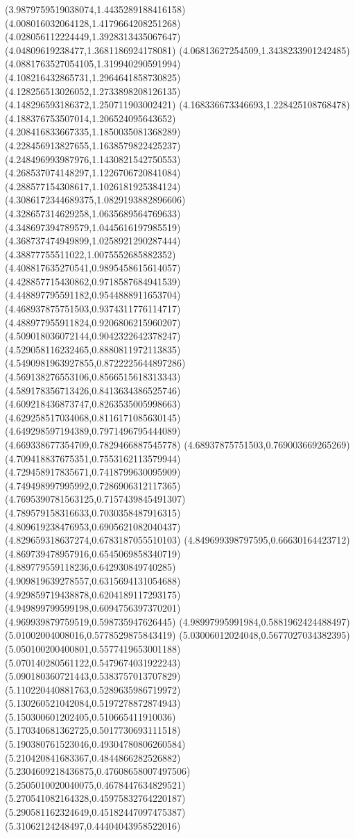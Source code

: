 {(3.9879759519038074,1.4435289188416158)
(4.008016032064128,1.4179664208251268)
(4.028056112224449,1.3928313435067647)
(4.04809619238477,1.3681186924178081)
(4.06813627254509,1.3438233901242485)
(4.0881763527054105,1.319940290591994)
(4.108216432865731,1.2964641858730825)
(4.128256513026052,1.2733898208126135)
(4.148296593186372,1.250711903002421)
(4.168336673346693,1.228425108768478)
(4.188376753507014,1.206524095643652)
(4.208416833667335,1.1850035081368289)
(4.228456913827655,1.1638579822425237)
(4.248496993987976,1.1430821542750553)
(4.268537074148297,1.1226706720841084)
(4.288577154308617,1.1026181925384124)
(4.3086172344689375,1.0829193882896606)
(4.328657314629258,1.0635689564769633)
(4.348697394789579,1.0445616197985519)
(4.368737474949899,1.0258921290287444)
(4.38877755511022,1.0075552685882352)
(4.408817635270541,0.9895458615614057)
(4.428857715430862,0.9718587684941539)
(4.448897795591182,0.9544888911653704)
(4.468937875751503,0.9374311776114717)
(4.488977955911824,0.9206806215960207)
(4.509018036072144,0.9042322642378247)
(4.529058116232465,0.8880811972113835)
(4.5490981963927855,0.8722225644897286)
(4.569138276553106,0.8566515618313343)
(4.589178356713426,0.8413634386525746)
(4.609218436873747,0.8263535005998663)
(4.629258517034068,0.8116171085630145)
(4.649298597194389,0.7971496795444089)
(4.669338677354709,0.7829466887545778)
(4.68937875751503,0.769003669265269)
(4.709418837675351,0.7553162113579944)
(4.729458917835671,0.7418799630095909)
(4.749498997995992,0.7286906312117365)
(4.7695390781563125,0.7157439845491307)
(4.789579158316633,0.7030358487916315)
(4.809619238476953,0.6905621082040437)
(4.829659318637274,0.6783187055510103)
(4.849699398797595,0.66630164423712)
(4.869739478957916,0.6545069858340719)
(4.889779559118236,0.642930849740285)
(4.909819639278557,0.6315694131054688)
(4.929859719438878,0.6204189117293175)
(4.949899799599198,0.6094756397370201)
(4.969939879759519,0.598735947626445)
(4.98997995991984,0.5881962424488497)
(5.01002004008016,0.5778529875843419)
(5.03006012024048,0.5677027034382395)
(5.050100200400801,0.5577419653001188)
(5.070140280561122,0.5479674031922243)
(5.090180360721443,0.5383757013707829)
(5.110220440881763,0.5289635986719972)
(5.130260521042084,0.5197278872874943)
(5.150300601202405,0.510665411910036)
(5.170340681362725,0.5017730693111518)
(5.190380761523046,0.49304780806260584)
(5.210420841683367,0.4844866282526882)
(5.2304609218436875,0.47608658007497506)
(5.2505010020040075,0.4678447634829521)
(5.270541082164328,0.45975832764220187)
(5.290581162324649,0.45182447097475387)
(5.31062124248497,0.44404043958522016)
}
